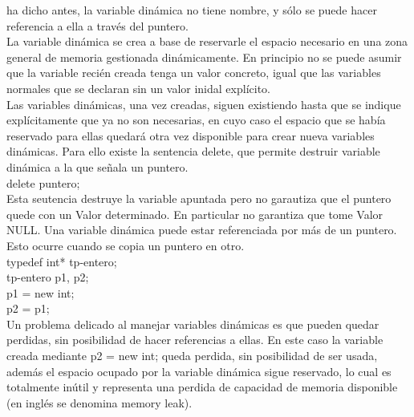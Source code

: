\documentclass[11pt,a4paper]{article}
\begin{document}
  	ha dicho antes, la variable dinámica no tiene nombre, y sólo se puede hacer referencia a ella a través del puntero.\\
  	La variable dinámica se crea a base de reservarle el espacio necesario en una zona general de memoria gestionada dinámicamente. En principio no se puede
  	asumir que la variable recién creada tenga un valor concreto, igual que las
  	variables normales que se declaran sin un valor inidal explícito.\\
  	Las variables dinámicas, una vez creadas, siguen existiendo hasta que se indique
  	explícitamente que ya no son necesarias, en cuyo caso el espacio que se había reservado para ellas quedará otra vez disponible para crear nueva variables dinámicas. Para ello existe la sentencia delete, que permite destruir
  	variable dinámica a la que señala un puntero.\\
  	delete puntero;\\
  	Esta seutencia destruye la variable apuntada pero no garautiza que el puntero
  	quede con un Valor determinado. En particular no garantiza que tome Valor NULL. Una variable dinámica puede estar referenciada por más de un puntero. Esto
  	ocurre cuando se copia un puntero en otro.\\
  	typedef int* tp-entero;\\
  	tp-entero p1, p2;\\
  	p1 = new int;\\
  	p2 = p1;\\
  	Un problema delicado al manejar variables dinámicas es que pueden quedar perdidas, sin posibilidad de hacer referencias a ellas. En este caso la variable creada mediante p2 = new int; queda perdida, sin posibilidad de ser usada, además el espacio ocupado por la variable dinámica sigue reservado, lo cual es totalmente inútil y representa una perdida de capacidad de memoria disponible (en inglés se denomina memory leak).
\end{document}
